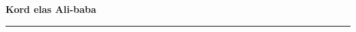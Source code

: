 \documentclass[10pt]{book}
\begin{document}
{
  \samepage
  \raggedbottom
  \raggedright
  \sloppy


  \vspace{0.2in}

  \noindent\begin{minipage}{.1\textwidth}
    \hfill\vspace{0.1in}
  \end{minipage}%
  \noindent\begin{minipage}{.8\textwidth}
    \centering
    \bfseries
    \large Kord elas Ali-baba
  \end{minipage}%
  \noindent\begin{minipage}{.1\textwidth}
      \hfill\vspace{0.1in}
  \end{minipage}

  \nopagebreak[4]
  \vspace{0.1in}
  \nopagebreak[4]
  \hrule height 0.05ex
  \nopagebreak[4]
  \vspace{-0.05in}




}
\end{document}
